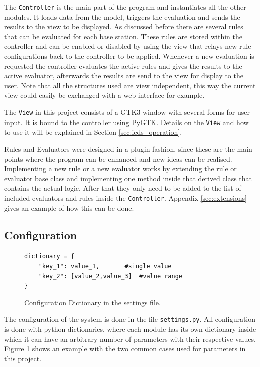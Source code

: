 The \texttt{Controller} is the main part of the program and instantiates all the other modules.
It loads data from the model, triggers the evaluation and sends the results to the view to be displayed.
As discussed before there are several rules that can be evaluated for each base station.
These rules are stored within the controller and can be enabled or disabled by using the view that relays new rule configurations back to the controller to be applied. 
Whenever a new evaluation is requested the controller evaluates the active rules and gives the results to the active evaluator, afterwards the results are send to the view for display to the user.
Note that all the structures used are view independent, this way the current view could easily be exchanged with a web interface for example.

The \texttt{View} in this project consists of a GTK3 window with several forms for user input.
It is bound to the controller using PyGTK.
Details on the \texttt{View} and how to use it will be explained in Section \ref{sec:icds_operation}.

Rules and Evaluators were designed in a plugin fashion, since these are the main points where the program can be enhanced and new ideas can be realised.
Implementing a new rule or a new evaluator works by extending the rule or evaluator base class and implementing one method inside that derived class that contains the actual logic.
After that they only need to be added to the list of included evaluators and rules inside the \texttt{Controller}.
Appendix \ref{sec:extensions} gives an example of how this can be done.

\subsection{Configuration}
\label{sec:configuration}
\begin{figure}
\begin{lstlisting}
dictionary = {
	"key_1": value_1,		#single value
	"key_2": [value_2,value_3]	#value range
}
\end{lstlisting}
\caption{Configuration Dictionary in the settings file.}
\label{fig:python_dict}
\end{figure}
The configuration of the system is done in the file \texttt{settings.py}.
All configuration is done with python dictionaries, where each module has its own dictionary inside which it can have an arbitrary number of parameters with their respective values.
Figure \ref{fig:python_dict} shows an example with the two common cases used for parameters in this project.

